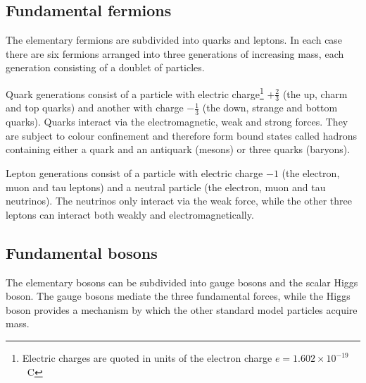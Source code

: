 \subsection{Fundamental fermions}
The elementary fermions are subdivided into quarks and leptons. In each case 
there are six fermions arranged into three generations of increasing mass, each 
generation consisting of a doublet of particles.

Quark generations consist of a particle with electric charge\footnote{Electric 
charges are quoted in units of the electron charge $e=1.602\times10^{-19}$~C} 
$+\frac{2}{3}$ (the up, charm and top quarks) and another with charge 
$-\frac{1}{3}$ (the down, strange and bottom quarks). Quarks interact via the 
electromagnetic, weak and strong forces. They are subject to colour confinement 
and therefore form bound states called hadrons containing either a quark and an 
antiquark (mesons) or three quarks (baryons).

Lepton generations consist of a particle with electric charge $-1$ (the 
electron, muon and tau leptons) and a neutral particle (the electron, muon and 
tau neutrinos). The neutrinos only interact via the weak force, while the other 
three leptons can interact both weakly and electromagnetically.

\subsection{Fundamental bosons}
The elementary bosons can be subdivided into gauge bosons and the scalar Higgs 
boson. The gauge bosons mediate the three fundamental forces, while the Higgs 
boson provides a mechanism by which the other standard model particles acquire 
mass.

